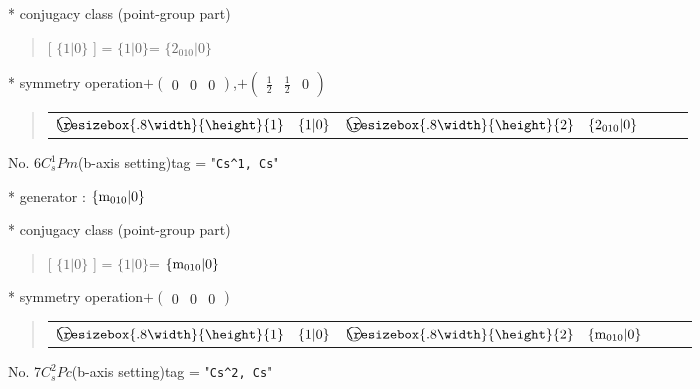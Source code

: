 \documentclass[fleqn,10pt,landscape]{jsarticle}
\begin{document}
* conjugacy class (point-group part)
\begin{quote}
[ $\{1|0\}$ ] = \quad $\{1|0\}$\newline[ $\{2{}_{010}|0\}$ ] = \quad $\{2{}_{010}|0\}$\newline
\end{quote}

* symmetry operation\quad$+\begin{pmatrix} 0 & 0 & 0 \end{pmatrix}$,\quad $+\begin{pmatrix} \frac{1}{2} & \frac{1}{2} & 0 \end{pmatrix}$
\begin{quote}
\begin{tabular}{lllll}
$ {\ooalign{\hfil\resizebox{.8\width}{\height}{1}\hfil\crcr\raise.1ex\hbox{\large$\bigcirc$}}}\quad \{1|0\} $ & $ {\ooalign{\hfil\resizebox{.8\width}{\height}{2}\hfil\crcr\raise.1ex\hbox{\large$\bigcirc$}}}\quad \{2{}_{010}|0\} $
\end{tabular}
\end{quote}


\newpage

No. 6\quad$C_{s}^{1}$\quad$Pm$\quad(b-axis setting)\quad[ monoclinic ]
tag = "{\tt Cs^1, Cs}"

* generator : $\{{\rm m}_{010}|0\}$

* conjugacy class (point-group part)
\begin{quote}
[ $\{1|0\}$ ] = \quad $\{1|0\}$\newline[ $\{{\rm m}_{010}|0\}$ ] = \quad $\{{\rm m}_{010}|0\}$\newline
\end{quote}

* symmetry operation\quad$+\begin{pmatrix} 0 & 0 & 0 \end{pmatrix}$
\begin{quote}
\begin{tabular}{lllll}
$ {\ooalign{\hfil\resizebox{.8\width}{\height}{1}\hfil\crcr\raise.1ex\hbox{\large$\bigcirc$}}}\quad \{1|0\} $ & $ {\ooalign{\hfil\resizebox{.8\width}{\height}{2}\hfil\crcr\raise.1ex\hbox{\large$\bigcirc$}}}\quad \{{\rm m}_{010}|0\} $
\end{tabular}
\end{quote}


\newpage

No. 7\quad$C_{s}^{2}$\quad$Pc$\quad(b-axis setting)\quad[ monoclinic ]
tag = "{\tt Cs^2, Cs}"
\end{document}
